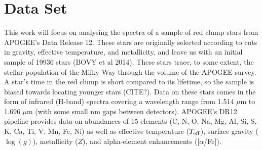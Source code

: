 \documentclass[preprint]{aastex}
\begin{document}
 




\section{Data Set}
\label{sec:data}
This work will focus on analysing the spectra of a sample of red clump stars from APOGEE's Data Release 12. These stars are originally selected according to cuts in gravity, effective temperature, and metallicity, and leave us with an initial sample of 19936 stars (BOVY et al 2014). These stars trace, to some extent, the stellar population of the Milky Way through the volume of the APOGEE survey. A star's time in the red clump is short compared to its lifetime, so the sample is biased towards locating younger stars (CITE?). Data on these stars comes in the form of infrared (H-band) spectra covering a wavelength range from 1.514 $\mu$m to 1.696 $\mu$m (with some small nm gaps between detectors). APOGEE's DR12 pipeline provides data on abundances of 15 elements (C, N, O, Na, Mg, Al, Si, S, K, Ca, Ti, V, Mn, Fe, Ni) as well as effective temperature ($T_{\rm eff}$), surface gravity ($\log(g)$), metallicity ($Z$), and alpha-element enhancements ([$\alpha$/Fe]).
\end{document}

